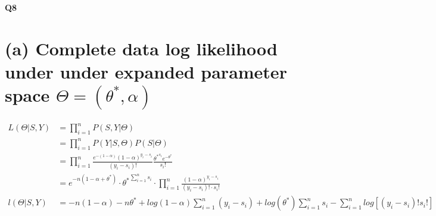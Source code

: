 \documentclass[11pt]{article}
\begin{document}
%

\newcommand{\Ito}{$It\hat{o}$'$s~Lemma$}

\newcommand\ind{\stackrel{\rm ind}{\sim}}
\newcommand\iid{\stackrel{\rm iid}{\sim}}
\renewcommand\c{\mathbf{c}}
\newcommand\y{\mathbf{y}}
\newcommand\z{\mathbf{z}}
\renewcommand\P{\mathbf{P}}
\newcommand\W{\mathbf{W}}
\newcommand\X{\mathbf{X}}
\newcommand\Y{\mathbf{Y}}
\newcommand\Z{\mathbf{Z}}
\newcommand\J{{\cal J}}
\newcommand\B{{\cal B}}
\newcommand\K{{\cal K}}
\newcommand\N{{\rm N}}
\newcommand\bs{\boldsymbol}
\newcommand\bth{\bs\theta}
\newcommand\bbe{\bs\beta}
\renewcommand\*{^\star}

\def\spacingset#1{\renewcommand{\baselinestretch}%
{#1}\small\normalsize} \spacingset{1}



  \bigskip
  \bigskip
  \bigskip
  \begin{center}
    {\LARGE\bf Q8}
  \end{center}
  \medskip



\spacingset{1.45}





\section*{(a) Complete data log likelihood under under expanded parameter space $\Theta = (\theta^*, \alpha)$}
\begin{align*}
L(\Theta | S, Y) & = \prod_{i=1}^{n}P(S,Y|\Theta)\\
&=\prod_{i=1}^{n} P(Y|S,\Theta) P(S|\Theta) \\
&=\prod_{i=1}^{n}\frac{e^{-(1-\alpha)}(1-\alpha)^{y_i-s_i}}{(y_i-s_i)!} \frac{{\theta^*}^{s_i}e^{-\theta^*}}{s_i!}\\
&= e^{-n(1-\alpha+\theta^*)} \cdot {\theta^*}^{\sum_{i=1}^{n}s_i} \cdot \prod_{i=1}^{n}\frac{(1-\alpha)^{y_i-s_i}}{(y_i-s_i)! \cdot s_i!}\\
l(\Theta | S, Y) & = -n(1-\alpha) -n\theta^* + log(1-\alpha) \sum_{i=1}^{n}(y_i-s_i) + log(\theta^*)\sum_{i=1}^{n}s_i -\sum_{i=1}^n log\left[(y_i-s_i)! s_i!\right] 
\end{align*}
\end{document}
